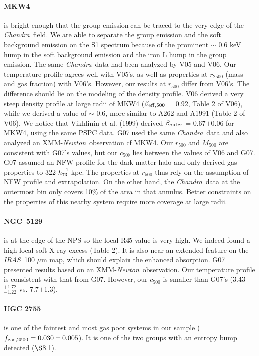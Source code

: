 \documentclass{aastex}
\def\chandra    {{\em Chandra}\/}
\def\xmm        {XMM-{\em Newton}\/}
\def\iras        {{\em IRAS}\/}
\begin{document}
\begin{appendix}
\paragraph{MKW4} is bright enough that the group emission can be traced to
the very edge of the \chandra\ field. We are able to separate the group emission
and the soft background emission on the S1 spectrum because of the prominent
$\sim$ 0.6 keV hump in the soft background emission and the iron L hump in
the group emission. The same \chandra\ data had been analyzed by V05 and V06.
Our temperature profile agrees well with V05's, as well as properties at $r_{2500}$
(mass and gas fraction) with V06's. However, our results at $r_{500}$ differ from V06's.
The difference should lie on the modeling of the density profile. V06 
derived a very steep density profile at large radii of MKW4 ($\beta_{\rm eff, 500}$
= 0.92, Table 2 of V06), while we derived a value of $\sim$ 0.6, more similar
to A262 and A1991 (Table 2 of V06). We notice that Vikhlinin et al. (1999)
derived $\beta_{\rm outer}$ = 0.67$\pm$0.06 for MKW4, using the same PSPC
data.
G07 used the same \chandra\ data and also analyzed an \xmm\ observation of
MKW4. Our $r_{500}$ and $M_{500}$ are consistent with G07's values, but our
$c_{500}$ lies between the values of V06 and G07. G07 assumed an NFW profile for
the dark matter halo and only derived gas properties to 322 $h_{73}^{-1}$ kpc.
The properties at $r_{500}$ thus rely on the assumption of NFW profile and
extrapolation. 
On the other hand, the \chandra\ data at the outermost
bin only covers 10\% of the area in that annulus. Better constraints on the
properties of this nearby system require more coverage at large radii.

\paragraph{NGC~5129} is at the edge of the NPS so the local R45 value is very
high. We indeed found a high local soft X-ray excess (Table 2). It is also near
an extended feature on the \iras\ 100 $\mu$m map, which should explain the enhanced
absorption. G07 presented results based on an \xmm\ observation. Our temperature
profile is consistent with that from G07. However, our $c_{500}$ is smaller
than G07's (3.43$^{+1.72}_{-1.22}$ vs. 7.7$\pm$1.3).

\paragraph{UGC 2755} is one of the faintest and most gas poor systems
in our sample ($f_{\rm gas, 2500} = 0.030\pm0.005$). It is one of the two groups with
an entropy bump detected ($\S$8.1). 


\end{appendix}
\end{document}
